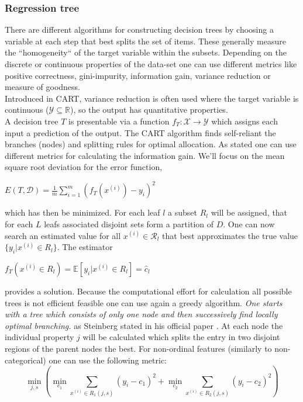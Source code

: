 \documentclass[12pt, a4paper]{article}
\begin{document}
\subsubsection{Regression tree}
\label{sec: decision_trees}
There are different algorithms for constructing decision trees by choosing a variable at each step that best splits the set of items. These generally measure the ``homogeneity`` of the target variable within the subsets. Depending on the discrete or continuous properties of the data-set one can use different metrics like positive correctness, gini-impurity, information gain, variance reduction or measure of goodness. \\
Introduced in CART, variance reduction is often used where the target variable is continuous ($\mathcal{Y} \subseteq \mathbb{R}$), so the output has quantitative properties.\\
A decision tree $T$ is presentable via a function $f_T : \mathcal{X} \rightarrow \mathcal{Y}$ which assigns each input a prediction of the output. The CART algorithm finds self-reliant the branches (nodes) and splitting rules for optimal allocation. 
As stated one can use different metrics for calculating the information gain.
We'll focus on the mean square root deviation for the error function,
\begin{center}
    $E(T,\mathcal{D}) = \frac{1}{m} \sum_{i=1}^m (f_T(x^{(i)}) - y_i)^2$
\end{center}
which has then be minimized. For each leaf $l$ a subset $R_l$ will be assigned, that for each $L$ leafs associated disjoint sets form a partition of $D$. One can now search an estimated value for all $x^{(i)} \in \mathcal{R}_l$ that best approximates the true value $\{y_i | x^{(i)} \in R_l\}$. 
The estimator 
\begin{center}
    $f_T(x^{(i)} \in R_l) = \mathbb{E}[y_i | x^{(i)} \in R_l] = \hat{c}_l$
\end{center}
provides a solution. Because the computational effort for calculation all possible trees is not efficient feasible one can use again a greedy algorithm. 
\textit{
One starts with a tree which consists of only one node and then successively find locally optimal branching.
} as Steinberg stated in his official paper \cite{Dan2009}.
At each node the individual property $j$ will be calculated which splits the entry in two disjoint regions of the parent nodes the best. For non-ordinal features (similarly to non-categorical) one can use the following metric:
\begin{equation}
    \underset{ j,s }{\min} \left( 
    \underset{ c_1 }{\min} 
    \sum_{x^{(i)} \in R_1(j,s)} (y_i - c_1)^2 + 
    \underset{ c_2 }{\min} 
    \sum_{x^{(i)} \in R_2(j,s)} (y_i - c_2)^2
    \right)
\end{equation}
\end{document}
